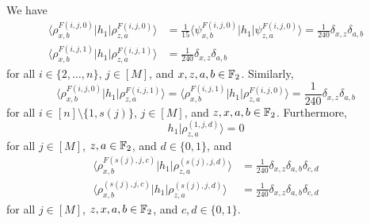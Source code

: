 \documentclass[../thesis-main/thesis-main]{subfiles}
\begin{document}
We have
\begin{align}
\langle\rho_{x,b}^{F(i,j,0)}|h_{1}|\rho_{z,a}^{F(i,j,0)}\rangle & =\frac{1}{15}\langle\psi_{x,b}^{F(i,j,0)}|h_{1}|\psi_{z,a}^{F(i,j,0)}\rangle=\frac{1}{240}\delta_{x,z}\delta_{a,b}\label{eq:diag_F0}\\
\langle\rho_{x,b}^{F(i,j,1)}|h_{1}|\rho_{z,a}^{F(i,j,1)}\rangle & =\frac{1}{240}\delta_{x,z}\delta_{a,b}\label{eq:diag_F1}
\end{align}
for all $i\in\{2,\ldots,n\}$, $j\in[M]$, and $x,z,a,b\in\mathbb{F}_2$. Similarly,
\begin{equation}
\langle\rho_{x,b}^{F(i,j,0)}|h_{1}|\rho_{z,a}^{F(i,j,1)}\rangle=\langle\rho_{x,b}^{F(i,j,1)}|h_{1}|\rho_{z,a}^{F(i,j,0)}\rangle=\frac{1}{240}\delta_{x,z}\delta_{a,b}\label{eq:F_h1_matels}
\end{equation}
for all $i \in [n]\setminus\{1,s(j)\}$, $j\in[M]$, and $z,x,a,b\in\mathbb{F}_2$. Furthermore,
\begin{equation}
h_{1}|\rho_{z,a}^{(1,j,d)}\rangle=0\label{eq:h1_row1}
\end{equation}
for all $j\in[M]$, $z,a\in \mathbb{F}_2$, and $d\in\{0,1\}$, and
\begin{align}
\langle\rho_{x,b}^{F(s(j),j,c)}|h_{1}|\rho_{z,a}^{\left(s(j),j,d\right)}\rangle & =\frac{1}{240}\delta_{x,z}\delta_{a,b}\delta_{c,d}\label{eq:F_L_eqn_h1}\\
\langle\rho_{x,b}^{(s(j),j,c)}|h_{1}|\rho_{z,a}^{\left(s(j),j,d\right)}\rangle & =\frac{1}{240}\delta_{x,z}\delta_{a,b}\delta_{c,d}\label{eq:L_L_eqn_h1}
\end{align}
for all $j\in[M]$, $z,x,a,b\in\mathbb{F}_2$, and $c,d\in\{0,1\}$.
\end{document}
